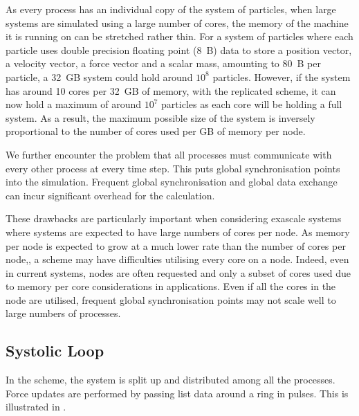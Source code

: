 As every process has an individual copy of the system of particles,
when large systems are simulated using a large number of cores,
the memory of the machine it is running on can be stretched rather thin.
%
For a system of particles where each particle uses double
precision floating point (8~B) data to store
a position vector,
a velocity vector,
a force vector and
a scalar mass,
amounting to 80~B per particle, a 32~GB system could hold around $10^8$
particles.
%
However, if the system has around 10 cores per 32~GB of memory,
with the replicated scheme,
it can now hold a maximum of around $10^7$ particles
as each core will be holding a full system.
%
As a result, the maximum possible size of the system is
inversely proportional to
the number of cores used per GB of memory per node.

We further encounter the problem that all processes must communicate
with every other process at every time step.
%
This puts global synchronisation points into the simulation.
%
Frequent global synchronisation and global data exchange can incur
significant overhead for the calculation.

%
These drawbacks are particularly important when considering exascale systems
where systems are expected to have large numbers of cores per node.
%
As memory per node is expected to grow at a much lower rate than
the number of cores per node,,
a \replicateddata{} scheme may have difficulties utilising every core on a node.
%
Indeed, even in current systems, nodes are often requested and only a
subset of cores used due to memory per core considerations in applications.
%
Even if all the cores in the node are utilised, frequent global synchronisation
points may not scale well to large numbers of processes.



\subsection{Systolic Loop}
\label{sec:background:subsec:systolic_loop}

%
In the \systolicloop{} scheme, the system is split up and distributed among
all the processes.
%
Force updates are performed by passing list data around a ring in pulses.
%
This is illustrated in .

